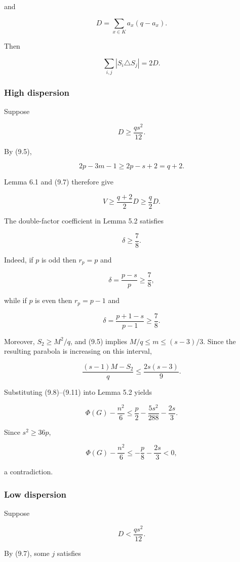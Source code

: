 \documentclass[
  11pt,
]{article}
\begin{document}
and

\[
D=\sum_{x\in K}a_x(q-a_x).
\tag{9.6}
\]

Then

\[
\sum_{i,j}|S_i\triangle S_j|=2D.
\tag{9.7}
\]

\subsubsection{High dispersion}\label{high-dispersion}

Suppose

\[
D\ge\frac{qs^2}{12}.
\tag{9.8}
\]

By (9.5),

\[
2p-3m-1\ge2p-s+2=q+2.
\]

Lemma 6.1 and (9.7) therefore give

\[
V
\ge
\frac{q+2}{2}D
\ge
\frac q2D.
\tag{9.9}
\]

The double-factor coefficient in Lemma 5.2 satisfies

\[
\boxed{\delta\ge\frac78.}
\tag{9.10}
\]

Indeed, if \(p\) is odd then \(r_p=p\) and

\[
\delta=\frac{p-s}{p}\ge\frac78,
\]

while if \(p\) is even then \(r_p=p-1\) and

\[
\delta=\frac{p+1-s}{p-1}\ge\frac78.
\]

Moreover, \(S_2\ge M^2/q\), and (9.5) implies \(M/q\le m\le(s-3)/3\).
Since the resulting parabola is increasing on this interval,

\[
\frac{(s-1)M-S_2}{q}
\le
\frac{2s(s-3)}9.
\tag{9.11}
\]

Substituting (9.8)--(9.11) into Lemma 5.2 yields

\[
\Phi(G)-\frac{n^2}{6}
\le
\frac p2-\frac{5s^2}{288}-\frac{2s}{3}.
\tag{9.12}
\]

Since \(s^2\ge36p\),

\[
\Phi(G)-\frac{n^2}{6}
\le
-\frac p8-\frac{2s}{3}<0,
\]

a contradiction.

\subsubsection{Low dispersion}\label{low-dispersion}

Suppose

\[
D<\frac{qs^2}{12}.
\tag{9.13}
\]

By (9.7), some \(j\) satisfies
\end{document}
